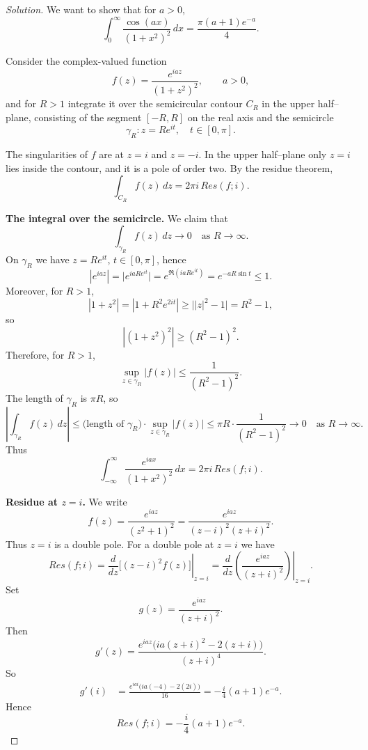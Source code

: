 \documentclass[12pt, a4paper]{report}
\theoremstyle{spaced}
\begin{document}
\begin{proof}[Solution]
	We want to show that for $a>0$,
	\[
		\int_{0}^{\infty} \frac{\cos(ax)}{(1+x^{2})^{2}}\, dx
		= \frac{\pi (a+1)e^{-a}}{4}.
	\]

	Consider the complex-valued function
	\[
		f(z) = \frac{e^{iaz}}{(1+z^{2})^{2}}, \qquad a>0,
	\]
	and for  \(R>1\) integrate it over the semicircular contour $C_R$ in the upper half–plane,
	consisting of the segment $[-R,R]$ on the real axis and the semicircle
	\[
		\gamma_R : z = Re^{it}, \quad t \in [0,\pi].
	\]

	The singularities of $f$ are at $z = i$ and $z = -i$. In the upper half–plane
	only $z = i$ lies inside the contour, and it is a pole of order two.
	By the residue theorem,
	\[
		\int_{C_R} f(z)\,dz = 2\pi i\,Res(f;i).
	\]

	\medskip

	\noindent\textbf{The integral over the semicircle.}
	We claim that
	\[
		\int_{\gamma_R} f(z)\,dz \longrightarrow 0 \quad \text{as } R\to\infty.
	\]
	On $\gamma_R$ we have $z = Re^{it}$, $t\in[0,\pi]$, hence
	\[
		|e^{iaz}| = \bigl|e^{iaRe^{it}}\bigr|
		= e^{\Re(i a R e^{it})}
		= e^{-aR\sin t} \le 1.
	\]
	Moreover, for $R>1$,
	\[
		|1+z^2|
		= |1+R^2 e^{2it}|
		\ge \bigl||z|^{2}-1\bigr| = R^2 - 1,
	\]
	so
	\[
		|(1+z^2)^2| \ge (R^2 - 1)^2.
	\]
	Therefore, for $R>1$,
	\[
		\sup_{z\in\gamma_R} |f(z)|
		\le \frac{1}{(R^2-1)^2}.
	\]
	The length of $\gamma_R$ is $\pi R$, so
	\[
		\left|\int_{\gamma_R} f(z)\,dz\right|
		\le \text{(length of $\gamma_R$)}\cdot \sup_{z\in\gamma_R}|f(z)|
		\le \pi R \cdot \frac{1}{(R^2-1)^2}
		\longrightarrow 0 \quad\text{as } R\to\infty.
	\]
	Thus
	\[
		\int_{-\infty}^{\infty} \frac{e^{iax}}{(1+x^{2})^{2}}\,dx
		= 2\pi i\,Res(f;i).
	\]

	\medskip

	\noindent\textbf{Residue at $z=i$.}
	We write
	\[
		f(z) = \frac{e^{iaz}}{(z^2+1)^2}
		= \frac{e^{iaz}}{(z-i)^2(z+i)^2}.
	\]
	Thus $z=i$ is a double pole. For a double pole at $z=i$ we have
	\[
		Res(f;i)
		= \left.\frac{d}{dz}\bigl[(z-i)^2 f(z)\bigr]\right|_{z=i}
		= \left.\frac{d}{dz}\left(\frac{e^{iaz}}{(z+i)^2}\right)\right|_{z=i}.
	\]
	Set
	\[
		g(z) = \frac{e^{iaz}}{(z+i)^2}.
	\]
	Then
	\[
		g'(z)
		= \frac{e^{iaz}\big(ia(z+i)^2 - 2(z+i)\big)}{(z+i)^4}.
	\]
	So
	\begin{align*}
		g'(i)
		 & = \frac{e^{iai}\big(ia(-4) - 2(2i)\big)}{16}
		= -\frac{i}{4}(a+1)e^{-a}.
	\end{align*}
	Hence
	\[
		Res(f;i) = -\frac{i}{4}(a+1)e^{-a}.
	\]


\end{proof}
\end{document}
